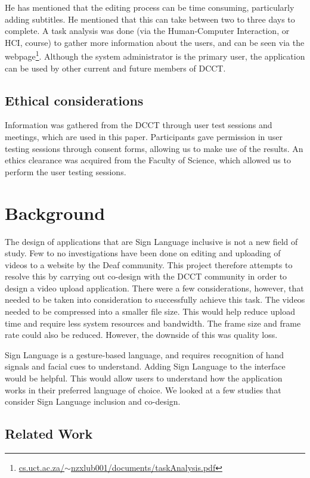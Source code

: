 \documentclass{sig-alternate-05-2015}
\begin{document}
He has mentioned that the editing process can be time consuming, particularly adding subtitles. He mentioned that this can take between two to three days to complete. A task analysis was done (via the Human-Computer Interaction, or HCI, course) to gather more information about the users, and can be seen via the webpage\footnote{\href{http://people.cs.uct.ac.za/~nzxlub001/documents/taskAnalysis.pdf}{cs.uct.ac.za/$\sim$nzxlub001/documents/taskAnalysis.pdf}}. Although the system administrator is the primary user, the application can be used by other current and future members of DCCT.

\subsection{Ethical considerations}
Information was gathered from the DCCT through user test sessions and meetings, which are used in this paper. Participants gave permission in user testing sessions through consent forms, allowing us to make use of the results. An ethics clearance was acquired from the Faculty of Science, which allowed us to perform the user testing sessions.

\section{Background}
The design of applications that are Sign Language inclusive is not a new field of study. Few to no investigations have been done on editing and uploading of videos to a website by the Deaf community. This project therefore attempts to resolve this by carrying out co-design with the DCCT community in order to design a video upload application. There were a few considerations, however, that needed to be taken into consideration to successfully achieve this task. The videos needed to be compressed into a smaller file size. This would help reduce upload time and require less system resources and bandwidth. The frame size and frame rate could also be reduced. However, the downside of this was quality loss.

Sign Language is a gesture-based language, and requires recognition of hand signals and facial cues to understand. Adding Sign Language to the interface would be helpful. This would allow users to understand how the application works in their preferred language of choice. We looked at a few studies that consider Sign Language inclusion and co-design.

\subsection{Related Work}
\end{document}
